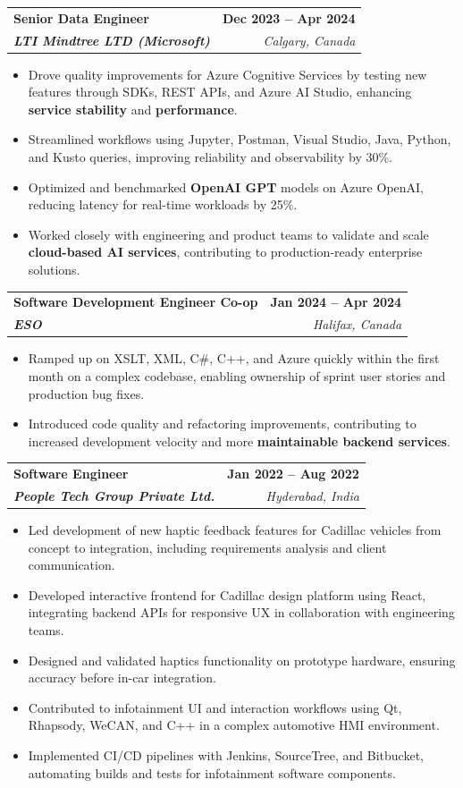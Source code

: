 \documentclass[letterpaper,11pt]{article}
\makeatletter
\newcommand{\resumeItem}[1]{
  \item\small{
    {#1 \vspace{-2pt}}
  }
}
\newcommand{\resumeSubheading}[4]{
  \vspace{-2pt}\item
    \begin{tabular*}{1.0\textwidth}[t]{l@{\extracolsep{\fill}}r}
      \textbf{#1} & \textbf{\small #2} \\
      \textit{\small#3} & \textit{\small #4} \\
    \end{tabular*}\vspace{-7pt}
}
\newcommand{\resumeItemListStart}{\begin{itemize}}
\newcommand{\resumeItemListEnd}{\end{itemize}\vspace{-5pt}}
\makeatother
\begin{document}
    \resumeSubheading
      {\textbf{Senior Data Engineer}}{\textbf{Dec 2023 -- Apr 2024}}
      {\textbf{LTI Mindtree LTD (Microsoft)}}{Calgary, Canada}
      \resumeItemListStart
        \resumeItem{Drove quality improvements for Azure Cognitive Services by testing new features through SDKs, REST APIs, and Azure AI Studio, enhancing \textbf{service stability} and \textbf{performance}.}
        \resumeItem{Streamlined workflows using Jupyter, Postman, Visual Studio, Java, Python, and Kusto queries, improving reliability and observability by 30\%.}
        \resumeItem{Optimized and benchmarked \textbf{OpenAI GPT} models on Azure OpenAI, reducing latency for real-time workloads by 25\%.}
        \resumeItem{Worked closely with engineering and product teams to validate and scale \textbf{cloud-based AI services}, contributing to production-ready enterprise solutions.}
      \resumeItemListEnd
    
    \resumeSubheading
      {\textbf{Software Development Engineer Co-op}}{\textbf{Jan 2024 -- Apr 2024}}
      {\textbf{ESO}}{Halifax, Canada}
      \resumeItemListStart
        \resumeItem{Ramped up on XSLT, XML, C\#, C++, and Azure quickly within the first month on a complex codebase, enabling ownership of sprint user stories and production bug fixes.}
        \resumeItem{Introduced code quality and refactoring improvements, contributing to increased development velocity and more \textbf{maintainable backend services}.}
      \resumeItemListEnd

    \resumeSubheading
      {\textbf{Software Engineer}}{\textbf{Jan 2022 -- Aug 2022}}
      {\textbf{People Tech Group Private Ltd.}}{Hyderabad, India}
      \resumeItemListStart
        \resumeItem{Led development of new haptic feedback features for Cadillac vehicles from concept to integration, including requirements analysis and client communication.}
        \resumeItem{Developed interactive frontend for Cadillac design platform using React, integrating backend APIs for responsive UX in collaboration with engineering teams.}
        \resumeItem{Designed and validated haptics functionality on prototype hardware, ensuring accuracy before in-car integration.}
        \resumeItem{Contributed to infotainment UI and interaction workflows using Qt, Rhapsody, WeCAN, and C++ in a complex automotive HMI environment.}
        \resumeItem{Implemented CI/CD pipelines with Jenkins, SourceTree, and Bitbucket, automating builds and tests for infotainment software components.}
      \resumeItemListEnd
\end{document}
